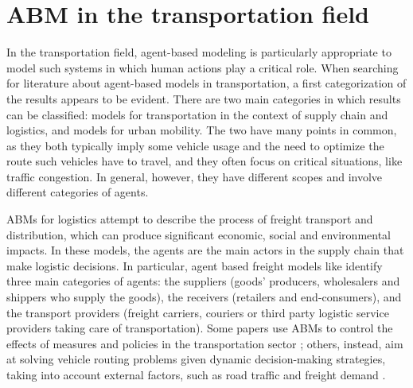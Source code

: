 
\section{ABM in the transportation field} \label{abm-t}
In the transportation field, agent-based modeling is particularly appropriate to model such systems in which human actions play a critical role. When searching for literature about agent-based models in transportation, a first categorization of the results appears to be evident. There are two main categories in which results can be classified: models for transportation in the context of supply chain and logistics, and models for urban mobility. The two have many points in common, as they both typically imply some vehicle usage and the need to optimize the route such vehicles have to travel, and they often focus on critical situations, like traffic congestion. In general, however, they have different scopes and involve different categories of agents. 

ABMs for logistics attempt to describe the process of freight transport and distribution, which can produce significant economic, social and environmental impacts. In these models, the agents are the main actors in the supply chain that make logistic decisions. In particular, agent based freight models like \cite{log1, log2} identify three main categories of agents: the suppliers (goods' producers, wholesalers and shippers who supply the goods), the receivers (retailers and end-consumers), and the transport providers (freight carriers, couriers or third party logistic service providers taking care of transportation). Some papers use ABMs to control the effects of measures and policies in the transportation sector \cite{log3, log4}; others, instead, aim at solving vehicle routing problems given dynamic decision-making strategies, taking into account external factors, such as road traffic and freight demand \cite{log5}. 

